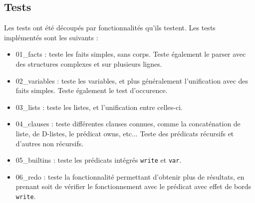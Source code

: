 \documentclass[../report.tex]{subfiles}
\begin{document}
\subsection{Tests}
Les tests ont été découpés par fonctionnalités qu'ils testent. Les tests implémentés sont les suivants :
\begin{itemize}
    \item 01\_facts : teste les faits simples, sans corps. Teste également le parser avec des structures complexes et sur plusieurs lignes.
    \item 02\_variables : teste les variables, et plus généralement l'unification avec des faits simples. Teste également le test d'occurence.
    \item 03\_lists : teste les listes, et l'unification entre celles-ci.
    \item 04\_clauses : teste différentes clauses connues, comme la concaténation de liste, de D-listes, le prédicat owns, etc... Teste des prédicats récursifs et d'autres non récursifs.
    \item 05\_builtins : teste les prédicats intégrés \texttt{write} et \texttt{var}. 
    \item 06\_redo : teste la fonctionnalité permettant d'obtenir plus de résultats, en prenant soit de vérifier le fonctionnement avec le prédicat avec effet de bords \texttt{write}.
\end{itemize}
\end{document}
